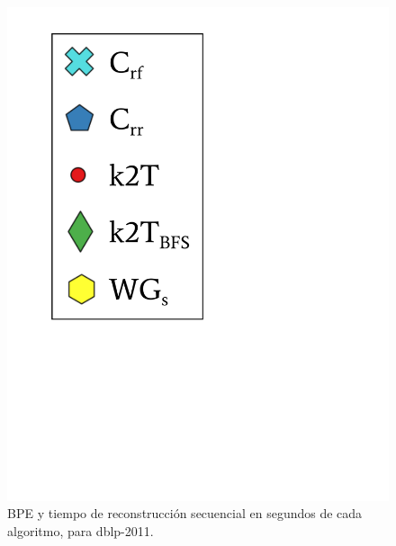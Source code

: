 \begin{frame}
\begin{figure}
\begin{minipage}{1\textwidth}
\begin{minipage}{0.15\textwidth}
    			\includegraphics[scale=.16, clip, trim=70 200 280 40]{../img/bpeTimes/labelSec.pdf}
    		\end{minipage}	
    	\end{minipage}

	\caption{BPE y tiempo de reconstrucción secuencial en segundos de cada algoritmo, para dblp-2011.}
\end{figure}

\end{frame}

